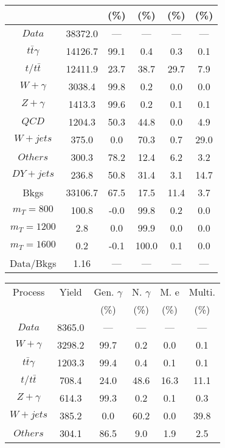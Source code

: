 \begin{figure}
\begin{minipage}[c]{0.32\textwidth}
{\begin{tabular}{cccccc}
 &  & (\%) & (\%) & (\%) & (\%)  \\
\hline
                                                                      $ Data $ &  38372.0 &  --- &  --- &  --- &  ---\\
$ t\bar{t}\gamma $ &  14126.7 &  99.1 &  0.4 &  0.3 &  0.1\\
$ t/t\bar{t} $ &  12411.9 &  23.7 &  38.7 &  29.7 &  7.9\\
$ W+\gamma $ &  3038.4 &  99.8 &  0.2 &  0.0 &  0.0\\
$ Z+\gamma $ &  1413.3 &  99.6 &  0.2 &  0.1 &  0.1\\
$ QCD $ &  1204.3 &  50.3 &  44.8 &  0.0 &  4.9\\
$ W+jets $ &  375.0 &  0.0 &  70.3 &  0.7 &  29.0\\
$ Others $ &  300.3 &  78.2 &  12.4 &  6.2 &  3.2\\
$ DY+jets $ &  236.8 &  50.8 &  31.4 &  3.1 &  14.7\\
Bkgs &  33106.7 &  67.5 &  17.5 &  11.4 &  3.7\\
$ m_{T} = 800 $ &  100.8 &  -0.0 &  99.8 &  0.2 &  0.0\\
$ m_{T} = 1200 $ &  2.8 &  0.0 &  99.9 &  0.0 &  0.0\\
$ m_{T} = 1600 $ &  0.2 &  -0.1 &  100.0 &  0.1 &  0.0\\
Data/Bkgs &  1.16 &  --- &  --- &  --- &  ---\\
\hline
\end{tabular}
}
\end{minipage}
\begin{minipage}[c]{0.32\textwidth}
\centering
\tiny{
\begin{tabular}{cccccc}
\hline
Process & Yield & Gen. $\gamma$ & N. $\gamma$ & M. e & Multi. \\
 &  & (\%) & (\%) & (\%) & (\%)  \\
\hline
                                                                      $ Data $ &  8365.0 &  --- &  --- &  --- &  ---\\
$ W+\gamma $ &  3298.2 &  99.7 &  0.2 &  0.0 &  0.1\\
$ t\bar{t}\gamma $ &  1203.3 &  99.4 &  0.4 &  0.1 &  0.1\\
$ t/t\bar{t} $ &  708.4 &  24.0 &  48.6 &  16.3 &  11.1\\
$ Z+\gamma $ &  614.3 &  99.3 &  0.2 &  0.1 &  0.3\\
$ W+jets $ &  385.2 &  0.0 &  60.2 &  0.0 &  39.8\\
$ Others $ &  304.1 &  86.5 &  9.0 &  1.9 &  2.5\\

\end{tabular}}
\end{minipage}
\end{figure}
